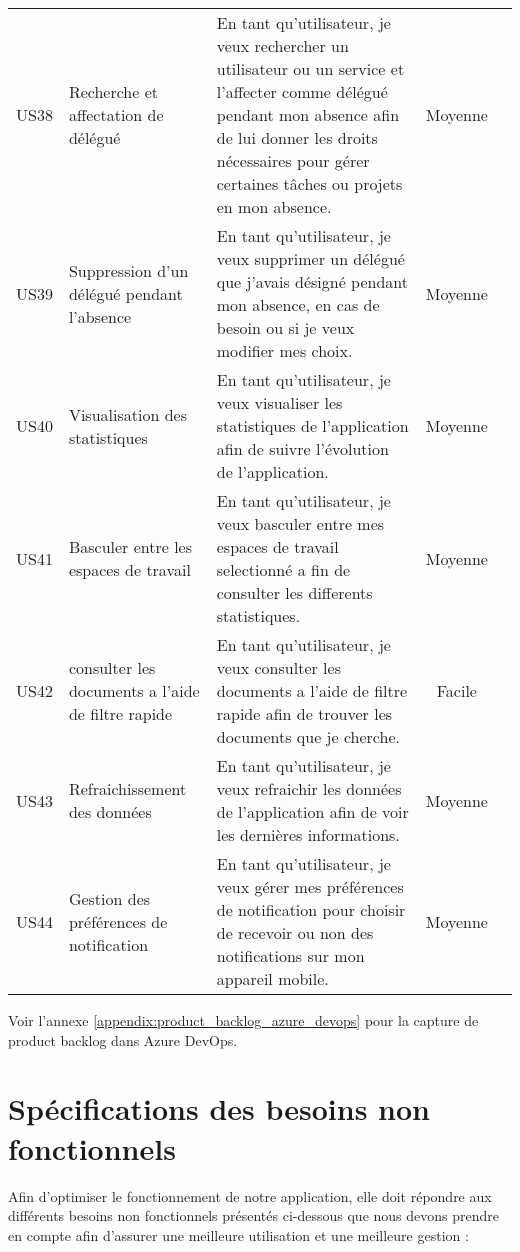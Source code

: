 \begin{landscape}
\begin{adjustwidth}{-1cm}{}
\begin{longtable}{|c|p{5cm}|p{12cm}|c|c|}
    \cline{1-4}
    US38&Recherche et affectation de délégué&En tant qu'utilisateur, je veux rechercher un utilisateur ou un service et l'affecter comme délégué pendant mon absence afin de lui donner les droits nécessaires pour gérer certaines tâches ou projets en mon absence.&Moyenne& \\
    \cline{1-4}
    US39&Suppression d'un délégué pendant l'absence&En tant qu'utilisateur, je veux supprimer un délégué que j'avais désigné pendant mon absence, en cas de besoin ou si je veux modifier mes choix.&Moyenne&\\
    
    \cline{1-4}
    US40&Visualisation des statistiques&En tant qu'utilisateur, je veux visualiser les statistiques de l'application afin de suivre l'évolution de l'application.&Moyenne&\\

    \cline{1-4}
    US41&Basculer entre les espaces de travail&En tant qu’utilisateur, je veux basculer entre mes espaces de travail selectionné a fin de consulter les differents statistiques. &Moyenne&\\
    
    
    \cline{1-4}
    US42&consulter les documents a l'aide de filtre rapide&En tant qu’utilisateur, je veux consulter les documents a l’aide de filtre rapide afin de trouver les documents que je cherche. &Facile&\\
    
    \cline{1-4}
    US43&Refraichissement des données&En tant qu'utilisateur, je veux refraichir les données de l'application afin de voir les dernières informations.&Moyenne&\\
    
    \cline{1-4}
    US44&Gestion des préférences de notification&En tant qu'utilisateur, je veux gérer mes préférences de notification pour choisir de recevoir ou non des notifications sur mon appareil mobile.&Moyenne&\\
    
    \hline
  \end{longtable}
\end{adjustwidth}
\end{landscape}

Voir l'annexe \ref{appendix:product_backlog_azure_devops} pour la capture de product backlog dans Azure DevOps.

\section{Spécifications des besoins non fonctionnels}
Afin d'optimiser le fonctionnement de notre application, elle doit répondre aux différents besoins non fonctionnels présentés ci-dessous que nous devons prendre en compte afin d'assurer une meilleure utilisation et une meilleure gestion :

